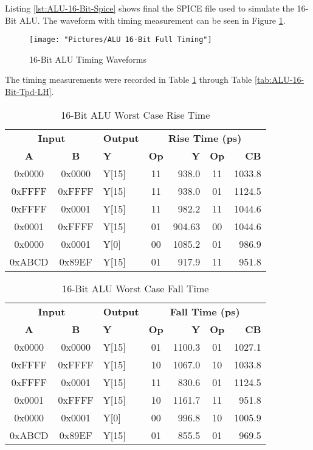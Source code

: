 \documentclass[11pt]{article}
\begin{document}
			Listing \ref{lst:ALU-16-Bit-Spice} shows final the SPICE file used to simulate the 16-Bit ALU.  The waveform with timing measurement can be seen in Figure \ref{fig:alu-16-bit-full-timing}.
		
			\begin{figure}[H]
				\centering
				\texttt{[image: "Pictures/ALU 16-Bit Full Timing"]}
				\caption{16-Bit ALU Timing Waveforms}
				\label{fig:alu-16-bit-full-timing}
			\end{figure}
			
			The timing measurements were recorded in Table \ref{tab:ALU-16-Bit-Risetime} through Table \ref{tab:ALU-16-Bit-Tpd-LH}.
		
			\begin{table}[H]
				\centering
				\caption{16-Bit ALU Worst Case Rise Time}
				\label{tab:ALU-16-Bit-Risetime}
				\begin{tabular}{|cclcrcr|}
					\hline
					\multicolumn{2}{|c}{\textbf{Input}} & \textbf{Output} & \multicolumn{4}{c|}{\textbf{Rise Time (ps)}} \\
					\textbf{A} & \textbf{B} & \textbf{Y} & \textbf{Op} & \textbf{Y} & \textbf{Op} & \textbf{CB} \\
					\hline
					0x0000 & 0x0000 & Y{[}15{]} & 11 & 938.0 & 11 & 1033.8 \\
					0xFFFF & 0xFFFF & Y{[}15{]} & 11 & 938.0 & 01 & 1124.5 \\
					0xFFFF & 0x0001 & Y{[}15{]} & 11 & 982.2 & 11 & 1044.6 \\
					0x0001 & 0xFFFF & Y{[}15{]} & 01 & 904.63 & 00 & 1044.6 \\
					0x0000 & 0x0001 & Y{[}0{]} & 00 & 1085.2 & 01 & 986.9 \\
					0xABCD & 0x89EF & Y{[}15{]} & 01 & 917.9 & 11 & 951.8 \\
					\hline
				\end{tabular}
			\end{table}
		
		
			\begin{table}[H]
				\centering
				\caption{16-Bit ALU Worst Case Fall Time}
				\label{tab:ALU-16-Bit-Falltime}
				\begin{tabular}{|cclcrcr|}
					\hline
					\multicolumn{2}{|c}{\textbf{Input}} & \textbf{Output} & \multicolumn{4}{c|}{\textbf{Fall Time (ps)}} \\
					\textbf{A} & \textbf{B} & \textbf{Y} & \textbf{Op} & \textbf{Y} & \textbf{Op} & \textbf{CB} \\
					\hline
					0x0000 & 0x0000 & Y{[}15{]} & 01 & 1100.3 & 01 & 1027.1 \\
					0xFFFF & 0xFFFF & Y{[}15{]} & 10 & 1067.0 & 10 & 1033.8 \\
					0xFFFF & 0x0001 & Y{[}15{]} & 11 & 830.6 & 01 & 1124.5 \\
					0x0001 & 0xFFFF & Y{[}15{]} & 10 & 1161.7 & 11 & 951.8 \\
					0x0000 & 0x0001 & Y{[}0{]} & 00 & 996.8 & 10 & 1005.9 \\
					0xABCD & 0x89EF & Y{[}15{]} & 01 & 855.5 & 01 & 969.5 \\
					\hline
				\end{tabular}
			\end{table}
		
\end{document}
